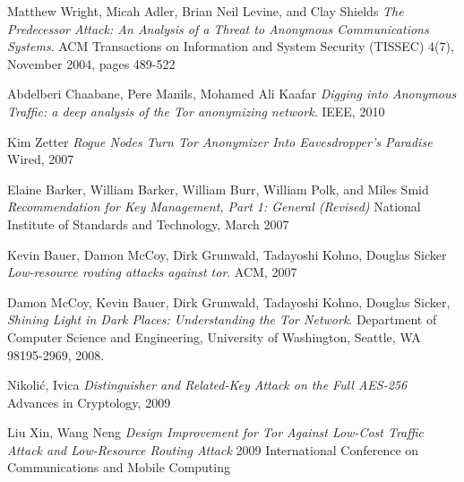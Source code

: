 \documentclass[journal]{IEEEtran}
\begin{document}
\begin{thebibliography}{9}


  Matthew Wright, Micah Adler, Brian Neil Levine, and Clay Shields
  \emph{The Predecessor Attack: An Analysis of a Threat to Anonymous Communications Systems}.
  ACM Transactions on Information and System Security (TISSEC) 4(7), November 2004, pages 489-522

  Abdelberi Chaabane, Pere Manils, Mohamed Ali Kaafar
  \emph{Digging into Anonymous Trafﬁc: a deep analysis of the Tor anonymizing network}.
  IEEE, 2010

  Kim Zetter
  \emph{Rogue Nodes Turn Tor Anonymizer Into Eavesdropper's Paradise}
  Wired, 2007

  Elaine Barker, William Barker, William Burr, William Polk, and Miles Smid
  \emph{Recommendation for Key Management, Part 1: General (Revised)}
  National Institute of Standards and Technology, March 2007

  Kevin Bauer, Damon McCoy, Dirk Grunwald, Tadayoshi Kohno, Douglas Sicker
  \emph{Low-resource routing attacks against tor}.
  ACM, 2007

  Damon McCoy, Kevin Bauer, Dirk Grunwald, Tadayoshi Kohno, Douglas Sicker,
  \emph{Shining Light in Dark Places: Understanding the Tor Network}.
  Department of Computer Science and Engineering,
  University of Washington, Seattle, WA 98195-2969,
  2008.

  Nikolić, Ivica
  \emph{Distinguisher and Related-Key Attack on the Full AES-256}
  Advances in Cryptology, 2009

  Liu Xin, Wang Neng
  \emph{Design Improvement for Tor Against Low-Cost Traffic Attack and Low-Resource Routing Attack}
  2009 International Conference on Communications and Mobile Computing


\end{thebibliography}
\end{document}
